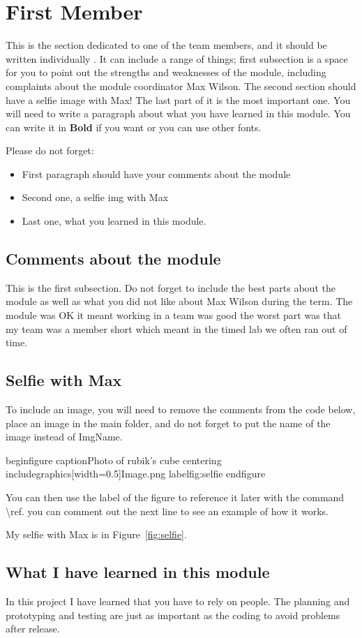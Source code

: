 \section{First Member}
This is the section dedicated to one of the team members, and it should be written individually . It can include a range of things; first subsection is a space for you to point out the strengths and weaknesses of the module, including complaints about the module coordinator Max Wilson. The second section should have a selfie image with Max! The last part of it is the most important one. You will need to write a paragraph about what you have learned in this module. You can write it in \textbf{Bold} if you want or you can use other fonts. 

Please do not forget:
\begin{itemize}
	\item First paragraph should have your comments about the module
	\item Second one, a selfie img with Max
	\item Last one, what you learned in this module.
\end{itemize}

\subsection{Comments about the module}
This is the first subsection. Do not forget to include the best parts about the module as well as what you did not like about Max Wilson during the term.
The module was OK it meant working in a team was good the worst part was that my team was a member short which meant in the timed lab we often ran out of time.
\subsection{Selfie with Max}

To include an image, you will need to remove the comments from the code below, place an image in the main folder, and do not forget to put the name of the image instead of ImgName. 

begin{figure}
caption{Photo of rubik's cube}
centering
includegraphics[width=0.5]{Image.png}
label{fig:selfie}
end{figure}

You can then use the label of the figure to reference it later with the command {\backslash}ref. you can comment out the next line to see an example of how it works.

My selfie with Max is in  Figure~\ref{fig:selfie}.

\subsection{What I have learned in this module}
In this project I have learned that you have to rely on people. The planning and prototyping and testing are just as important as the coding to avoid problems after release.

